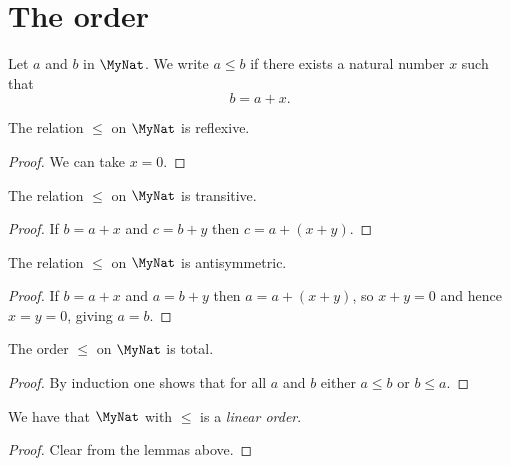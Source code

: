 \section{The order}

\begin{definition}
    \label{MyNat.le}
    \leanok
    Let $a$ and $b$ in $\MyNat$. We write $a \leq b$ if there exists a natural number $x$ such that
    \[
    b = a + x.
    \]
\end{definition}

\begin{lemma}
    \label{MyNat.le_refl}
    \leanok
    The relation $\leq$ on $\MyNat$ is reflexive.
\end{lemma}
\begin{proof}
    \leanok
    We can take $x = 0$.
\end{proof}

\begin{lemma}
    \label{MyNat.le_trans}
    \leanok
    The relation $\leq$ on $\MyNat$ is transitive.
\end{lemma}
\begin{proof}
    \leanok
    If $b = a + x$ and $c = b + y$ then $c = a + (x + y)$.
\end{proof}

\begin{lemma}
    \label{MyNat.le_antisymm}
    \leanok
    The relation $\leq$ on $\MyNat$ is antisymmetric.
\end{lemma}
\begin{proof}
    \leanok
    If $b = a + x$ and $a = b + y$ then $a = a + (x + y)$, so $x + y = 0$ and hence $x = y = 0$,
    giving $a = b$.
\end{proof}

\begin{lemma}
    \label{MyNat.le_total}
    \leanok
    The order $\leq$ on $\MyNat$ is total.
\end{lemma}
\begin{proof}
    \leanok
    By induction one shows that for all $a$ and $b$ either $a \leq b$ or $b \leq a$.
\end{proof}

\begin{lemma}
    \label{MyNat.linearOrder}
    \leanok
    We have that $\MyNat$ with $\leq$ is a \emph{linear order}.
\end{lemma}
\begin{proof}
    \leanok
    Clear from the lemmas above.
\end{proof}

